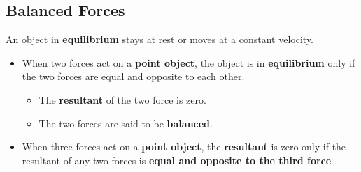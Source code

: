 \subsection{Balanced Forces}

An object in \textbf{equilibrium} stays at rest or moves at a constant velocity.

\begin{itemize}
    \item When two forces act on a \textbf{point object}, the object is in \textbf{equilibrium} only if the two forces are equal and opposite to each other.
        \begin{itemize}
            \item The \textbf{resultant} of the two force is zero.
            \item The two forces are said to be \textbf{balanced}.
        \end{itemize}
    \item When three forces act on a \textbf{point object}, the \textbf{resultant} is zero only if the resultant of any two forces is \textbf{equal and opposite to the third force}.
\end{itemize}
